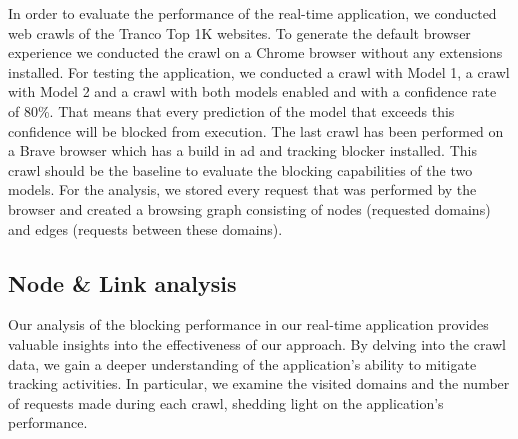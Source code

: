 In order to evaluate the performance of the real-time application, we conducted web crawls of the Tranco Top 1K websites. 
To generate the default browser experience we conducted the crawl on a Chrome browser without any extensions installed. For testing
the application, we conducted a crawl with Model 1, a crawl with Model 2 and a crawl with both models enabled and with a confidence
rate of 80\%. That means that every prediction of the model that exceeds this confidence will be blocked from execution. The last crawl
has been performed on a Brave browser which has a build in ad and tracking blocker installed. This crawl should be the baseline to evaluate
the blocking capabilities of the two models. For the analysis, we stored every request that was performed by the browser and created a 
browsing graph consisting of nodes (requested domains) and edges (requests between these domains).

\subsection{Node \& Link analysis}

Our analysis of the blocking performance in our real-time application provides valuable insights into the effectiveness
of our approach. By delving into the crawl data, we gain a deeper understanding of the application's ability to mitigate
tracking activities. In particular, we examine the visited domains and the number of requests made during each crawl, shedding
light on the application's performance.

